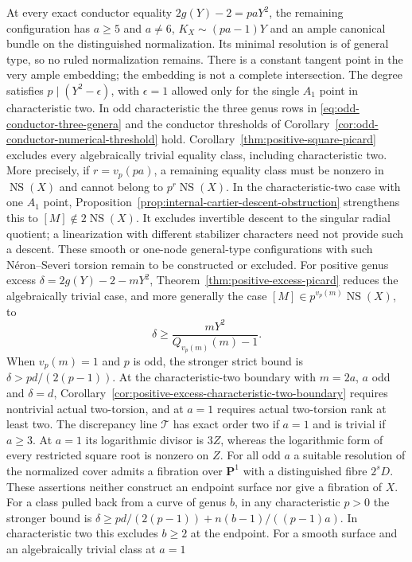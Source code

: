 \documentclass[11pt]{article}
\theoremstyle{remark}\newtheorem{remark}[theorem]{Remark}
\newcommand{\PP}{\mathbf P}
\begin{document}
At every exact conductor equality $2g(Y)-2=paY^2$, the remaining
configuration has $a\geq5$ and $a\ne6$, $K_X\sim(pa-1)Y$ and an ample
canonical bundle on the distinguished normalization. Its minimal
resolution is of general type, so no ruled normalization remains.
There is a constant tangent point in the very ample embedding;
the embedding is not a complete intersection.
The degree satisfies $p\mid(Y^2-\epsilon)$, with $\epsilon=1$
allowed only for the single $A_1$ point in characteristic two.
In odd characteristic the three genus rows in
\eqref{eq:odd-conductor-three-genera} and the conductor thresholds
of Corollary~\ref{cor:odd-conductor-numerical-threshold} hold.
Corollary~\ref{thm:positive-square-picard} excludes every
algebraically trivial equality class, including characteristic two.
More precisely, if $r=v_p(pa)$, a remaining equality class must be
nonzero in $\operatorname{NS}(X)$ and cannot belong to
$p^r\operatorname{NS}(X)$. In the characteristic-two case with
one $A_1$ point, Proposition~\ref{prop:internal-cartier-descent-obstruction}
strengthens this to $[M]\notin2\operatorname{NS}(X)$.
It excludes invertible descent to the singular radial quotient;
a linearization with different stabilizer characters need not
provide such a descent. These smooth or one-node general-type
configurations with such N\'eron--Severi torsion remain to be
constructed or excluded. For positive genus excess
$\delta=2g(Y)-2-mY^2$, Theorem~\ref{thm:positive-excess-picard}
reduces the algebraically trivial case, and more generally the case
$[M]\in p^{v_p(m)}\operatorname{NS}(X)$, to
\[
 \delta\geq\frac{mY^2}{Q_{v_p(m)}(m)-1}.
\]
When $v_p(m)=1$ and $p$ is odd, the stronger strict bound is
$\delta>pd/(2(p-1))$.
At the characteristic-two boundary with $m=2a$, $a$ odd and
$\delta=d$, Corollary~\ref{cor:positive-excess-characteristic-two-boundary}
requires nontrivial actual two-torsion, and at $a=1$ requires
actual two-torsion rank at least two. The discrepancy line
$\mathcal T$ has exact order two if $a=1$ and is trivial if $a\geq3$.
At $a=1$ its logarithmic divisor is $3Z$, whereas the logarithmic
form of every restricted square root is nonzero on $Z$.
For all odd $a$ a suitable resolution of the normalized cover admits
a fibration over $\PP^1$ with a distinguished fibre $2^sD$.
These assertions neither construct an endpoint surface nor give
a fibration of $X$.
For a class pulled back from a curve of genus $b$, in any
characteristic $p>0$ the stronger bound is
$\delta\geq pd/(2(p-1))+n(b-1)/((p-1)a)$.
In characteristic two this excludes $b\geq2$ at the endpoint.
For a smooth surface and an algebraically trivial class at $a=1$
\end{document}
